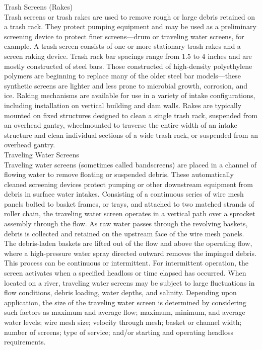 Trash Screens (Rakes)\\
Trash screens or trash rakes are used to remove rough or large debris retained on a trash rack. They protect pumping equipment and may be used as a preliminary screening device to protect finer screens—drum or traveling water screens, for example. A trash screen consists of one or more stationary trash rakes and a screen raking device. Trash rack bar spacings range from 1.5 to 4 inches and are mostly constructed of steel bars. Those constructed of high-density polyethylene polymers are beginning to replace many of the older steel bar models—these synthetic screens are lighter and less prone to microbial growth, corrosion, and ice. Raking mechanisms are available for use in a variety of intake configurations, including installation on vertical building and dam walls. Rakes are typically mounted on fixed structures designed to clean a single trash rack, suspended from an overhead gantry, wheelmounted to traverse the entire width of an intake structure and clean individual sections of a wide trash rack, or suspended from an overhead gantry.\\
Traveling Water Screens\\
Traveling water screens (sometimes called bandscreens) are placed in a channel of flowing water to remove floating or suspended debris. These automatically cleaned screening devices protect pumping or other downstream equipment from debris in surface water intakes. Consisting of a continuous series of wire mesh panels bolted to basket frames, or trays, and attached to two matched strands of roller chain, the traveling water screen operates in a vertical path over a sprocket assembly through the flow. As raw water passes through the revolving baskets, debris is collected and retained on the upstream face of the wire mesh panels. The debris-laden baskets are lifted out of the flow and above the operating flow, where a high-pressure water spray directed outward removes the impinged debris. This process can be continuous or intermittent. For intermittent operation, the screen activates when a specified headloss or time elapsed has occurred. When located on a river, traveling water screens may be subject to large fluctuations in flow conditions, debris loading, water depths, and salinity. Depending upon application, the size of the traveling water screen is determined by considering such factors as maximum and average flow; maximum, minimum, and average water levels; wire mesh size; velocity through mesh; basket or channel width; number of screens; type of service; and/or starting and operating headloss requirements.\\
